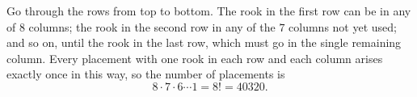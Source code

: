 Go through the rows from top to bottom. The rook in the first row can be in any of $8$ columns; the rook in the second row in any of the $7$ columns not yet used; and so on, until the rook in the last row, which must go in the single remaining column. Every placement with one rook in each row and each column arises exactly once in this way, so the number of placements is
\[8\cdot7\cdot6\cdots1=8!=\boxed{40320}.\]

